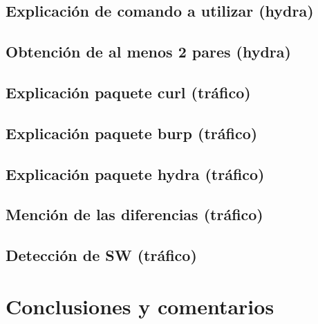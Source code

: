 \documentclass[letter,12pt]{article}
\begin{document}
\subsection{Explicación de comando a utilizar (hydra)}


\subsection{Obtención de al menos 2 pares (hydra)}

\subsection{Explicación paquete curl (tráfico)}

\subsection{Explicación paquete burp (tráfico)}

\subsection{Explicación paquete hydra (tráfico)}

\subsection{Mención de las diferencias (tráfico)}

\subsection{Detección de SW (tráfico)}



\section*{Conclusiones y comentarios}
\end{document}
